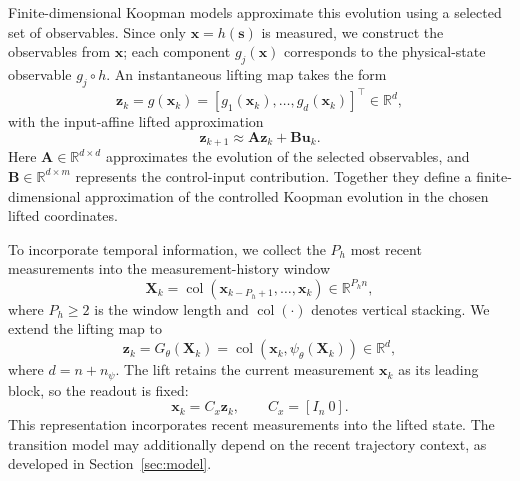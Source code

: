 \documentclass[journal]{IEEEtran}
\theoremstyle{plain}
\theoremstyle{definition}
\newcommand{\vx}{\mathbf{x}}
\newcommand{\vu}{\mathbf{u}}
\newcommand{\vs}{\mathbf{s}}
\newcommand{\vz}{\mathbf{z}}
\newcommand{\mA}{\mathbf{A}}
\newcommand{\mB}{\mathbf{B}}
\newcommand{\mX}{\mathbf{X}}
\newcommand{\R}{\mathbb{R}}
\newcommand{\col}{\operatorname{col}}
\begin{document}
Finite-dimensional Koopman models approximate this evolution using a selected set of observables. Since only $\vx=h(\vs)$ is measured, we construct the observables from $\vx$; each component $g_j(\vx)$ corresponds to the physical-state observable $g_j\circ h$. An instantaneous lifting map takes the form
\begin{equation}
\vz_k=g(\vx_k)=[g_1(\vx_k),\ldots,g_d(\vx_k)]^\top\in\R^d,
\label{eq:instantaneous_lifting}
\end{equation}
with the input-affine lifted approximation
\begin{equation}
\vz_{k+1}\approx\mA\vz_k+\mB\vu_k.
\label{eq:linear_lifted}
\end{equation}
Here $\mA\in\R^{d\times d}$ approximates the evolution of the selected observables, and $\mB\in\R^{d\times m}$ represents the control-input contribution. Together they define a finite-dimensional approximation of the controlled Koopman evolution in the chosen lifted coordinates.

To incorporate temporal information, we collect the $P_h$ most recent measurements into the measurement-history window
\begin{equation}
\mX_k=\col(\vx_{k-P_h+1},\ldots,\vx_k)\in\R^{P_h n},
\label{eq:measurement_window}
\end{equation}
where $P_h\ge2$ is the window length and $\col(\cdot)$ denotes vertical stacking. We extend the lifting map to
\begin{equation}
\vz_k=G_\theta(\mX_k)=\col(\vx_k,\psi_\theta(\mX_k))\in\R^d,
\label{eq:state_preserving_lifting}
\end{equation}
where $d=n+n_\psi$. The lift retains the current measurement $\vx_k$ as its leading block, so the readout is fixed:
\begin{equation}
\vx_k=C_x\vz_k,\qquad C_x=[I_n\ 0].
\label{eq:state_readout}
\end{equation}
This representation incorporates recent measurements into the lifted state. The transition model may additionally depend on the recent trajectory context, as developed in Section~\ref{sec:model}.
\end{document}
